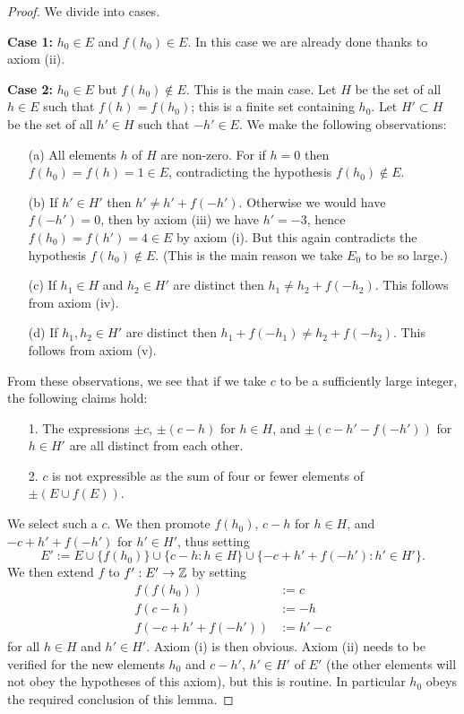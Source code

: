 \begin{proof}  We divide into cases.

  {\bf Case 1:} $h_0 \in E$ and $f(h_0) \in E$.  In this case we are already done thanks to axiom (ii).

  {\bf Case 2:} $h_0 \in E$ but $f(h_0) \not \in E$.  This is the main case.  Let $H$ be the set of all $h \in E$ such that $f(h) = f(h_0)$; this is a finite set containing $h_0$.  Let $H' \subset H$ be the set of all $h' \in H$ such that $-h' \in E$.  We make the following observations:
  \begin{itemize}
  \item[(a)] All elements $h$ of $H$ are non-zero.  For if $h=0$ then $f(h_0)=f(h)=1 \in E$, contradicting the hypothesis $f(h_0) \not \in E$.
  \item[(b)]  If $h' \in H'$ then $h' \neq h'+f(-h')$.  Otherwise we would have $f(-h')=0$, then by axiom (iii) we have $h' = -3$, hence $f(h_0) = f(h') = 4 \in E$ by axiom (i).  But this again contradicts the hypothesis $f(h_0) \not \in E$. (This is the main reason we take $E_0$ to be so large.)
  \item[(c)]  If $h_1 \in H$ and $h_2 \in H'$ are distinct then $h_1 \neq h_2+f(-h_2)$.  This follows from axiom (iv).
  \item[(d)]  If $h_1, h_2\in H'$ are distinct then $h_1+f(-h_1) \neq h_2+f(-h_2)$. This follows from axiom (v).
  \end{itemize}

  From these observations, we see that if we take $c$ to be a sufficiently large integer, the following claims hold:
  \begin{itemize}
  \item[1.]  The expressions $\pm c$, $\pm(c - h)$ for $h \in H$, and $\pm(c-h'-f(-h'))$ for $h \in H'$ are all distinct from each other.
  \item[2.]  $c$ is not expressible as the sum of four or fewer elements of $\pm (E \cup f(E))$.
  \end{itemize}

  We select such a $c$.  We then promote $f(h_0)$, $c - h$ for $h \in H$, and $-c+h'+f(-h')$ for $h' \in H'$, thus setting
  $$ E' := E \cup \{f(h_0)\} \cup \{ c-h: h \in H\} \cup \{ -c+h'+f(-h'): h' \in H'\}.$$
We then extend $f$ to $f': E' \to \mathbb{Z}$ by setting
\begin{align*}
  f(f(h_0)) &:= c \\
  f(c-h) &:= -h \\
  f(-c+h'+f(-h')) &:= h' - c
\end{align*}
for all $h \in H$ and $h' \in H'$.  Axiom (i) is then obvious.  Axiom (ii) needs to be verified for the new elements $h_0$ and $c-h'$, $h' \in H'$ of $E'$ (the other elements will not obey the hypotheses of this axiom), but this is routine.  In particular $h_0$ obeys the required conclusion of this lemma.


\end{proof}
